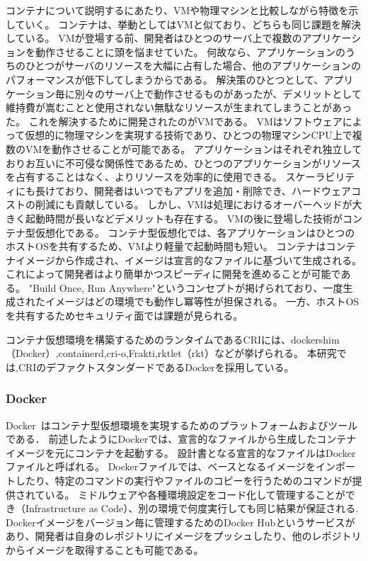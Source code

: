 コンテナについて説明するにあたり、VMや物理マシンと比較しながら特徴を示していく。
コンテナは、挙動としてはVMと似ており、どちらも同じ課題を解決している。
VMが登場する前、開発者はひとつのサーバ上で複数のアプリケーションを動作させることに頭を悩ませていた。
何故なら、アプリケーションのうちのひとつがサーバのリソースを大幅に占有した場合、他のアプリケーションのパフォーマンスが低下してしまうからである。
解決策のひとつとして、アプリケーション毎に別々のサーバ上で動作させるものがあったが、デメリットとして維持費が嵩むことと使用されない無駄なリソースが生まれてしまうことがあった。
これを解決するために開発されたのがVMである。
VMはソフトウェアによって仮想的に物理マシンを実現する技術であり、ひとつの物理マシンCPU上で複数のVMを動作させることが可能である。
アプリケーションはそれぞれ独立しておりお互いに不可侵な関係性であるため、ひとつのアプリケーションがリソースを占有することはなく、よりリソースを効率的に使用できる。
スケーラビリティにも長けており、開発者はいつでもアプリを追加・削除でき、ハードウェアコストの削減にも貢献している。
しかし、VMは処理におけるオーバーヘッドが大きく起動時間が長いなどデメリットも存在する。
VMの後に登場した技術がコンテナ型仮想化である。
コンテナ型仮想化では、各アプリケーションはひとつのホストOSを共有するため、VMより軽量で起動時間も短い。
コンテナはコンテナイメージから作成され、イメージは宣言的なファイルに基づいて生成される。
これによって開発者はより簡単かつスピーディに開発を進めることが可能である。
"Build Once, Run Anywhere"というコンセプトが掲げられており、一度生成されたイメージはどの環境でも動作し冪等性が担保される。
一方、ホストOSを共有するためセキュリティ面では課題が見られる。

コンテナ仮想環境を構築するためのランタイムであるCRIには、dockershim（Docker）,containerd,cri-o,Frakti,rktlet（rkt）などが挙げられる。
本研究では,CRIのデファクトスタンダードであるDockerを採用している。

\subsubsection{Docker}
\label{background:docker}

Docker~\cite{Docker}はコンテナ型仮想環境を実現するためのプラットフォームおよびツールである．
前述したようにDockerでは、宣言的なファイルから生成したコンテナイメージを元にコンテナを起動する。
設計書となる宣言的なファイルはDockerファイルと呼ばれる。
Dockerファイルでは、ベースとなるイメージをインポートしたり、特定のコマンドの実行やファイルのコピーを行うためのコマンドが提供されている。
ミドルウェアや各種環境設定をコード化して管理することができ（Infrastructure as Code）、別の環境で何度実行しても同じ結果が保証される.
Dockerイメージをバージョン毎に管理するためのDocker Hubというサービスがあり、開発者は自身のレポジトリにイメージをプッシュしたり、他のレポジトリからイメージを取得することも可能である。


